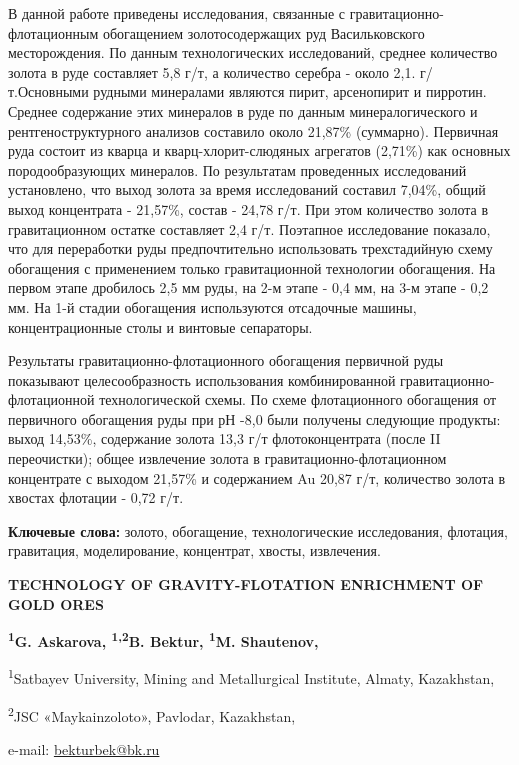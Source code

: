 В данной работе приведены исследования, связанные с
гравитационно-флотационным обогащением золотосодержащих руд
Васильковского месторождения. По данным технологических исследований,
среднее количество золота в руде составляет 5,8 г/т, а количество
серебра - около 2,1. г/т.Основными рудными минералами являются пирит,
арсенопирит и пирротин. Среднее содержание этих минералов в руде по
данным минералогического и рентгеноструктурного анализов составило около
21,87\% (суммарно). Первичная руда состоит из кварца и
кварц-хлорит-слюдяных агрегатов (2,71\%) как основных породообразующих
минералов. По результатам проведенных исследований установлено, что выход
золота за время исследований составил 7,04\%, общий выход концентрата -
21,57\%, состав - 24,78 г/т. При этом количество золота в гравитационном
остатке составляет 2,4 г/т. Поэтапное исследование показало, что для
переработки руды предпочтительно использовать трехстадийную схему
обогащения с применением только гравитационной технологии обогащения. На
первом этапе дробилось 2,5 мм руды, на 2-м этапе - 0,4 мм, на 3-м этапе
- 0,2 мм. На 1-й стадии обогащения используются отсадочные машины,
концентрационные столы и винтовые сепараторы.

Результаты гравитационно-флотационного обогащения первичной руды
показывают целесообразность использования комбинированной
гравитационно-флотационной технологической схемы. По схеме флотационного
обогащения от первичного обогащения руды при рН -8,0 были получены
следующие продукты: выход 14,53\%, содержание золота 13,3 г/т
флотоконцентрата (после II переочистки); общее извлечение золота в
гравитационно-флотационном концентрате с выходом 21,57\% и содержанием
Au 20,87 г/т, количество золота в хвостах флотации - 0,72 г/т.

{\bfseries Ключевые слова:} золото, обогащение, технологические
исследования, флотация, гравитация, моделирование, концентрат, хвосты,
извлечения.
\begin{articleheader}

{\bfseries TECHNOLOGY OF GRAVITY-FLOTATION ENRICHMENT OF GOLD ORES}

{\bfseries \textsuperscript{1}G. Askarova, \textsuperscript{1,2}B.
Bektur\textsuperscript{\envelope }, \textsuperscript{1}M. Shautenov,
}
\end{articleheader}

\begin{affiliation}

\textsuperscript{1}Satbayev University, Mining and Metallurgical
Institute, Almaty, Kazakhstan,

\textsuperscript{2}JSC «Maykainzoloto», Pavlodar, Kazakhstan,

e-mail: \href{mailto:bekturbek@bk.run}{bekturbek@bk.ru}
\end{affiliation}

